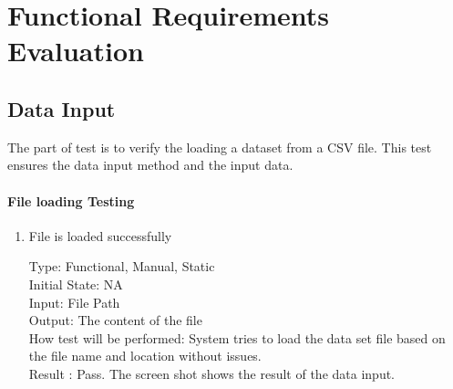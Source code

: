 \documentclass[12pt, titlepage]{article}
\begin{document}
\section{Functional Requirements Evaluation}
\subsection{Data Input}
The part of test is to verify the loading a dataset from a CSV file. This test ensures the data input method and the input data. 

\paragraph{File loading Testing }

\begin{enumerate}

\item{File is loaded successfully \label{TestInput1}\\}

Type: Functional, Manual, Static\\
Initial State: NA\\
Input: File Path\\
Output: The content of the file\\
How test will be performed: System tries to load the data set file based on the file name and location without issues.\\
Result : Pass. The screen shot shows the result of the data input. \\


\end{enumerate}
\end{document}
